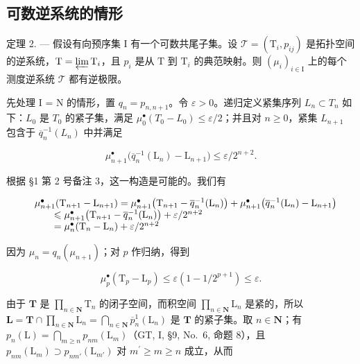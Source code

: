 \subsection{可数逆系统的情形}

定理 2. --- 假设有向预序集 I 有一个可数共尾子集。设 \(\mathcal{T} = (\mathrm{T}_i, p_{ij})\) 是拓扑空间的逆系统，\(\mathrm{T} = \varprojlim \mathrm{T}_i\)，且 \(p_i\) 是从 \(\mathrm{T}\) 到 \(\mathrm{T}_i\) 的典范映射。则 \((\mu_i)_{i \in \mathrm{I}}\) 上的每个测度逆系统 \(\mathcal{T}\) 都有逆极限。

先处理 I = N 的情形，置 \(q_{n} = p_{n,n+1}\)。令 \(\varepsilon > 0\)。递归定义紧集序列 \(L_{n} \subset T_{n}\) 如下：\(L_{0}\) 是 \(T_{0}\) 的紧子集，满足 \(\mu_{0}^{\bullet}(T_{0} - L_{0}) \leqslant \varepsilon / 2\)；并且对 \(n \geqslant 0\)，紧集 \(L_{n+1}\) 包含于 \(\overline{q}_{n}^{-1}(L_{n})\) 中并满足

\[
\mu_ {n + 1} ^ {\bullet} \big (\overline{q}_{n}^{-1} (\mathrm{L} _ {n}) - \mathrm{L} _ {n + 1} \big) \leqslant \varepsilon / 2 ^ {n + 2}.
\]

根据 §1 第 2 号备注 3，这一构造是可能的。我们有

\[
\begin{array}{r l} & {\mu_ {n + 1} ^ {\bullet} (\mathrm{T} _ {n + 1} - \mathrm{L} _ {n + 1}) = \mu_ {n + 1} ^ {\bullet} \big (\mathrm{T} _ {n + 1} - \overline{q}_{n}^{-1} (\mathrm{L} _ {n}) \big) + \mu_ {n + 1} ^ {\bullet} \big (\overline{q}_{n}^{-1} (\mathrm{L} _ {n}) - \mathrm{L} _ {n + 1} \big)} \\ & {\qquad \leqslant \mu_ {n + 1} ^ {\bullet} \big (\mathrm{T} _ {n + 1} - \overline{q}_{n}^{-1} (\mathrm{L} _ {n}) \big) + \varepsilon / 2 ^ {n + 2}} \\ & {\qquad = \mu_ {n} ^ {\bullet} (\mathrm{T} _ {n} - \mathrm{L} _ {n}) + \varepsilon / 2 ^ {n + 2}} \end{array}
\]

因为 \(\mu_{n} = q_{n}(\mu_{n + 1})\)；对 \(p\) 作归纳，得到

\[
\mu_ {p} ^ {\bullet} \left(\mathrm{T} _ {p} - \mathrm{L} _ {p}\right) \leqslant \varepsilon \left(1 - 1 / 2 ^ {p + 1}\right) \leqslant \varepsilon .
\]

由于 \(\mathbf{T}\) 是 \(\prod_{n\in \mathbf{N}}\mathrm{T}_n\) 的闭子空间，而积空间 \(\prod_{n\in \mathbf{N}}\mathrm{L}_n\) 是紧的，所以 \(\mathbf{L} = \mathbf{T}\cap \prod_{n\in \mathbf{N}}\mathrm{L}_n = \bigcap_{n\in \mathbf{N}}\overline{p}_n^1 (\mathrm{L}_n)\) 是 \(\mathbf{T}\) 的紧子集。取 \(n\in \mathbf{N}\)；有 \(p_n(\mathrm{L}) = \bigcap_{m\geqslant n}p_{nm}(\mathrm{L}_m)\)（GT, I, §9, No.~6, 命题 8），且 \(p_{nm}(\mathrm{L}_m)\supset p_{nm'}(\mathrm{L}_{m'})\) 对 \(m^{\prime}\geqslant m\geqslant n\) 成立，从而

